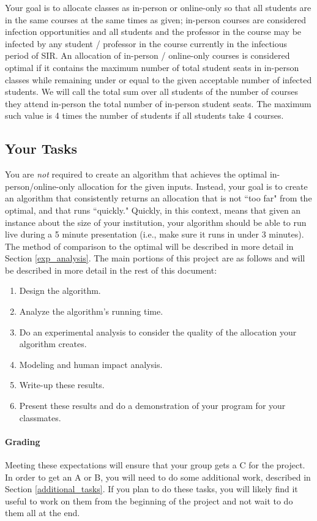 \documentclass[12pt]{article}
\begin{document}
Your goal is to allocate classes as in-person or online-only so that all students are in the same courses at the same times as given; in-person courses are considered infection opportunities and all students and the professor in the course may be infected by any student / professor in the course currently in the infectious period of SIR.  An allocation of in-person / online-only courses is considered optimal if it contains the maximum number of total student seats in in-person classes while remaining under or equal to the given acceptable number of infected students.  We will call the total sum over all students of the number of courses they attend in-person the total number of in-person student seats.  The maximum such value is 4 times the number of students if all students take 4 courses.

\subsection{Your Tasks}
You are \emph{not} required to create an algorithm that achieves the optimal in-person/online-only allocation for the given inputs.  Instead, your goal is to create an algorithm that consistently returns an allocation that is not ``too far" from the optimal, and that runs ``quickly."  Quickly, in this context, means that given an instance about the size of your institution, your algorithm should be able to run live during a 5 minute presentation (i.e., make sure it runs in under 3 minutes). The method of comparison to the optimal will be described in more detail in Section \ref{exp_analysis}.
The main portions of this project are as follows and will be described in more detail in the rest of this document:
\begin{enumerate}
\item Design the algorithm.
\item Analyze the algorithm's running time.
\item Do an experimental analysis to consider the quality of the allocation your algorithm creates.
\item Modeling and human impact analysis.
\item Write-up these results.
\item Present these results and do a demonstration of your program for your classmates.
\end{enumerate}

\paragraph{Grading}
Meeting these expectations will ensure that your group gets a C for the project.  In order to get an A or B, you will need to do some additional work, described in Section \ref{additional_tasks}.  If you plan to do these tasks, you will likely find it useful to work on them from the beginning of the project and not wait to do them all at the end.
\end{document}
